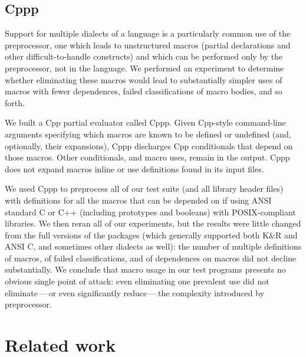 \documentclass[10pt]{article}
\begin{document}
\subsection{Cppp}

Support for multiple dialects of a language is a particularly common use of
the preprocessor, one which leads to unstructured macros (partial
declarations and other difficult-to-handle constructs) and which can be
performed only by the preprocessor, not in the language.  We performed an
experiment to determine whether eliminating these macros would lead to
substantially simpler uses of macros with fewer dependences, failed
classifications of macro bodies, and so forth.

We built a Cpp partial evaluator called Cppp.  Given Cpp-style command-line
arguments specifying which macros are known to be defined or undefined
(and, optionally, their expansions), Cppp discharges Cpp conditionals that
depend on those macros.  Other conditionals, and macro uses, remain in the
output.  Cppp does not expand macros inline or use definitions found in its
input files.


We used Cppp to preprocess all of our test suite (and all library header
files) with definitions for all the macros that can be depended on if using
ANSI standard C or C++ (including prototypes and booleans) with
POSIX-compliant libraries.  We then reran all of our experiments, but the
results were little changed from the full versions of the packages (which
generally supported both K\&R and ANSI C, and sometimes other dialects as
well): the number of multiple definitions of macros, of failed
classifications, and of dependences on macros did not decline
substantially.  We conclude that macro usage in our test programs presents
no obvious single point of attack: even eliminating one prevalent use did
not eliminate\,---\,or even significantly reduce\,---\,the complexity
introduced by preprocessor.


\section{Related work}
\label{sec:related}

\end{document}
